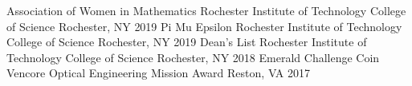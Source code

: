 \begin{cvhonors}
  \cvhonor
    {Association of Women in Mathematics}
    {Rochester Institute of Technology College of Science}
    {Rochester, NY}
    {2019} 
  \cvhonor
    {Pi Mu Epsilon}
    {Rochester Institute of Technology College of Science}
    {Rochester, NY}
    {2019} 
  \cvhonor
    {Dean's List}
    {Rochester Institute of Technology College of Science}
    {Rochester, NY}
    {2018}  
   \cvhonor
    {Emerald Challenge Coin}
    {Vencore Optical Engineering Mission Award}
    {Reston, VA}
    {2017}
\end{cvhonors}